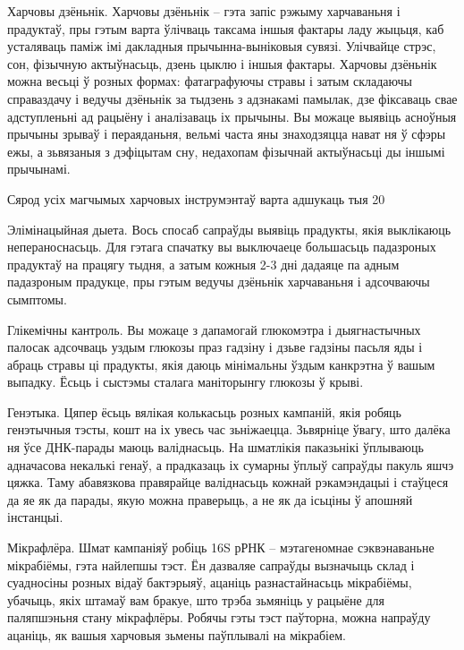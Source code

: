 Харчовы дзёньнік.
Харчовы дзёньнік – гэта запіс рэжыму харчаваньня і прадуктаў, пры гэтым варта ўлічваць таксама іншыя фактары ладу жыцьця, каб усталяваць паміж імі дакладныя прычынна-выніковыя сувязі. Улічвайце стрэс, сон, фізычную актыўнасьць, дзень цыклю і іншыя фактары. Харчовы дзёньнік можна весьці ў розных формах: фатаграфуючы стравы і затым складаючы справаздачу і ведучы дзёньнік за тыдзень з адзнакамі памылак, дзе фіксаваць свае адступленьні ад рацыёну і аналізаваць іх прычыны. Вы можаце выявіць асноўныя прычыны зрываў і пераяданьня, вельмі часта яны знаходзяцца нават ня ў сфэры ежы, а зьвязаныя з дэфіцытам сну, недахопам фізычнай актыўнасьці ды іншымі прычынамі.

Сярод усіх магчымых харчовых інструмэнтаў варта адшукаць тыя 20%

Элімінацыйная дыета. 
Вось спосаб сапраўды выявіць прадукты, якія выклікаюць непераноснасьць. Для гэтага спачатку вы выключаеце большасьць падазроных прадуктаў на працягу тыдня, а затым кожныя 2-3 дні дадаяце па адным падазроным прадукце, пры гэтым ведучы дзёньнік харчаваньня і адсочваючы сымптомы.

Глікемічны кантроль.
Вы можаце з дапамогай глюкомэтра і дыягнастычных палосак адсочваць уздым глюкозы праз гадзіну і дзьве гадзіны пасьля яды і абраць стравы ці прадукты, якія даюць мінімальны ўздым канкрэтна ў вашым выпадку. Ёсьць і сыстэмы сталага маніторынгу глюкозы ў крыві.

Генэтыка.
Цяпер ёсьць вялікая колькасьць розных кампаній, якія робяць генэтычныя тэсты, кошт на іх увесь час зьніжаецца. Зьвярніце ўвагу, што далёка ня ўсе ДНК-парады маюць валіднасьць. На шматлікія паказьнікі ўплываюць адначасова некалькі генаў, а прадказаць іх сумарны ўплыў сапраўды пакуль яшчэ цяжка. Таму абавязкова правярайце валіднасьць кожнай рэкамэндацыі і стаўцеся да яе як да парады, якую можна праверыць, а не як да ісьціны ў апошняй інстанцыі.

Мікрафлёра.
Шмат кампаніяў робіць 16S рРНК – мэтагеномнае сэквэнаваньне мікрабіёмы, гэта найлепшы тэст. Ён дазваляе сапраўды вызначыць склад і суадносіны розных відаў бактэрыяў, ацаніць разнастайнасьць мікрабіёмы, убачыць, якіх штамаў вам бракуе, што трэба зьмяніць у рацыёне для паляпшэньня стану мікрафлёры. Робячы гэты тэст паўторна, можна напраўду ацаніць, як вашыя харчовыя зьмены паўплывалі на мікрабіем.

